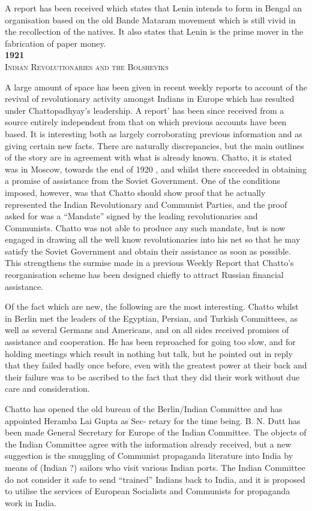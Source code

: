 A report has been received which states that Lenin intends to form in Bengal an organisation based on the old Bande Mataram movement which is still vivid in the recollection of the natives. It also states that Lenin is the prime mover in the fabrication of paper money.\\


\textbf{1921}\\


\textsc{Indian Revolutionaries and the Bolsheviks}


A large amount of space has been given in recent weekly reports to account of the revival of revolutionary activity amongst Indians in Europe which has resulted under Chattopadhyay's leadership. A report' has been since received from a source entirely independent from that on which previous accounts have been based. It is interesting both as largely corroborating previous information and as giving certain new facts. There are naturally discrepancies, but the main outlines of the story are in agreement with what is already known. Chatto, it is stated was in Moscow, towards the end of 1920 , and whilst there succeeded in obtaining a promise of assistance from the Soviet Government. One of 
the conditions imposed, however, was that Chatto should show proof that he actually represented the Indian Revolutionary and Communist Parties, and the proof asked for was a “Mandate” signed by the leading revolutionaries and Communists. Chatto was not able to produce any such mandate, but is now engaged in drawing all the well know revolutionaries into his net so that he may satisfy the Soviet Government and obtain their assistance as soon as possible. This strengthens the surmise made in a previous Weekly Report that Chatto's reorganisation scheme has been designed chiefly to attract Russian financial assistance. 

Of the fact which are new, the following are the most interesting. Chatto whilst in Berlin met the leaders of the Egyptian, Persian, and Turkish Committees, as well as several Germans and Americans, and on all sides received promises of assistance and cooperation. He has been reproached for going too slow, and for holding meetings which result in nothing but talk, but he pointed out in reply that they failed 
badly once before, even with the greatest power at their back and their failure was to be ascribed to the fact that they did their work without due care and consideration. 

Chatto has opened the old bureau of the Berlin/Indian Committee and has appointed Heramba Lai Gupta as Sec- 
retary for the time being. B. N. Dutt has been made General Secretary for Europe of the Indian Committee. The objects 
of the Indian Committee agree with the information already received, but a new suggestion is the smuggling of Communist propaganda literature into India by means of (Indian ?) sailors who visit various Indian ports. The Indian Committee do not consider it safe to send “trained” Indians back to India, and it is proposed to utilise the services of European Socialists and Communists for propaganda work in India. 

